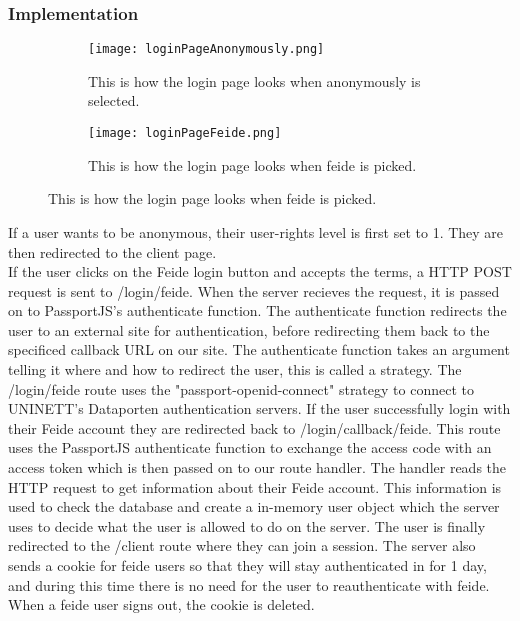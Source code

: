\subsubsection{Implementation}
\begin{figure}[h]
    \centering
    \begin{subfigure}{0.45\linewidth}
        \texttt{[image: loginPageAnonymously.png]}
        \caption{This is how the login page looks when anonymously is selected.}
        \label{fig:loginPageAnonoumsly}
    \end{subfigure}
    \begin{subfigure}{0.45\linewidth}
        \texttt{[image: loginPageFeide.png]}
        \caption{This is how the login page looks when feide is picked.}
        \label{fig:loginPageFeide}
    \end{subfigure}
\end{figure}
\noindent
If a user wants to be anonymous, their user-rights level is first set to 1. They are then redirected to the client page.
\\[11pt]
If the user clicks on the Feide login button and accepts the terms, a HTTP POST request is sent to /login/feide. When the server recieves the request, it is passed on to PassportJS's authenticate function. The authenticate function redirects the user to an external site for authentication, before redirecting them back to the specificed callback URL on our site. The authenticate function takes an argument telling it where and how to redirect the user, this is called a strategy. The /login/feide route uses the "passport-openid-connect" strategy to connect to UNINETT's Dataporten authentication servers. If the user successfully login with their Feide account they are redirected back to /login/callback/feide. This route uses the PassportJS authenticate function to exchange the access code with an access token which is then passed on to our route handler. The handler reads the HTTP request to get information about their Feide account. This information is used to check the database and create a in-memory user object which the server uses to decide what the user is allowed to do on the server. The user is finally redirected to the /client route where they can join a session. The server also sends a cookie for feide users so that they will stay authenticated in for 1 day, and during this time there is no need for the user to reauthenticate with feide. When a feide user signs out, the cookie is deleted.